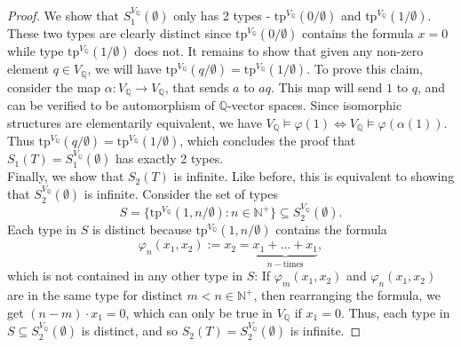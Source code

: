 \documentclass{article}
\begin{document}
\begin{enumerate}[label={\bf Q\arabic*:}]
\begin{proof}
      We show that $S_1^{V_{\mathbb{Q}}}(\emptyset)$ only has 2 types -
      $\text{tp}^{V_{\mathbb{Q}}}(0/\emptyset)$ and
      $\text{tp}^{V_{\mathbb{Q}}}(1/\emptyset)$. These two types are
      clearly distinct since $\text{tp}^{V_{\mathbb{Q}}}(0/\emptyset)$
      contains the formula $x=0$ while type
      $\text{tp}^{V_{\mathbb{Q}}}(1/\emptyset)$ does not. It remains to
      show that given any non-zero element $q\in V_\mathbb{Q}$, we will
      have $\text{tp}^{V_{\mathbb{Q}}}(q/\emptyset)=
      \text{tp}^{V_{\mathbb{Q}}}(1/\emptyset)$. To prove this claim,
      consider the map $\alpha:V_{\mathbb{Q}}\rightarrow V_{\mathbb{Q}}$,
      that sends $a$ to $aq$. This map will send $1$ to $q$, and can be
      verified to be automorphism of $\mathbb{Q}$-vector spaces. Since
      isomorphic structures are elementarily equivalent, we have
      $V_\mathbb{Q}\models\varphi(1)\Leftrightarrow
      V_\mathbb{Q}\models\varphi(\alpha(1))$. Thus
      $\text{tp}^{V_{\mathbb{Q}}}(q/\emptyset)=
      \text{tp}^{V_{\mathbb{Q}}}(1/\emptyset)$, which concludes the proof
      that $S_1(T)=S_1^{V_{\mathbb{Q}}}(\emptyset)$ has exactly 2 types. \\

      Finally, we show that $S_2(T)$ is infinite. Like before, this is
      equivalent to showing that $S_2^{V_{\mathbb{Q}}}(\emptyset)$ is
      infinite. Consider the set of types
      \[S=\{\text{tp}^{V_\mathbb{Q}}(1,n/\emptyset): n\in\mathbb{N}^+\}
      \subseteq S_2^{V_{\mathbb{Q}}}(\emptyset).\] Each type in $S$ is
      distinct because $\text{tp}^{V_\mathbb{Q}}(1,n/\emptyset)$ contains
      the formula \[\varphi_n(x_1,x_2):=
      x_2=\underbrace{x_1+\ldots+x_1}_{n-\text{times}},\] which is not
      contained in any other type in $S$: If $\varphi_m(x_1,x_2)$ and
      $\varphi_n(x_1,x_2)$ are in the same type for distinct
      $m<n\in\mathbb{N}^+$, then rearranging the formula, we get
      $(n-m)\cdot x_1=0$, which can only be true in $V_\mathbb{Q}$ if
      $x_1=0$. Thus, each type in $S\subseteq S_2^{V_\mathbb{Q}}(\emptyset)$
      is distinct, and so $S_2(T)=S_2^{V_\mathbb{Q}}(\emptyset)$ is
      infinite.
    \end{proof}
\end{enumerate}
\end{document}
